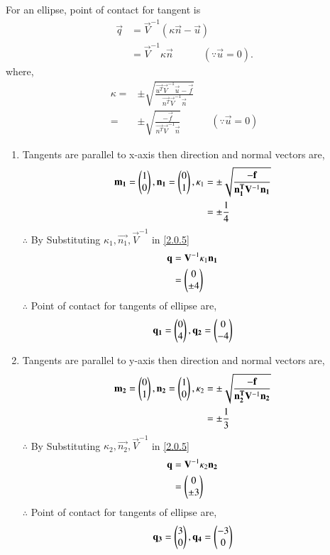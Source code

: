\documentclass[journal,12pt,twocolumn]{IEEEtran}
\begin{document}
For an ellipse, point of contact for tangent is
\begin{align}
\vec{q}&=\vec{V}^{-1}(\kappa\vec{n}-\vec{u})\\
&=\vec{V}^{-1}\kappa\vec{n}\quad\quad\quad(\because \vec{u}=0). \label{2.0.5}
\end{align}
where,
\begin{align}
\kappa=&\pm \sqrt{\frac{\vec{u^T}\vec{V}^{-1}\vec{u}-\vec{f}}{\vec{n^T}\vec{V}^{-1}\vec{n}}}\\
      =&\pm \sqrt{\frac{-\vec{f}}{\vec{n^T}\vec{V}^{-1}\vec{n}}}\label{2.0.7}\quad \quad\quad(\because \vec{u}=0)
\end{align}
\begin{enumerate}
\item Tangents are parallel to x-axis then direction and normal vectors are,
\begin{align}
\mathbf{m_1} = \begin{pmatrix}1\\0\end{pmatrix},\mathbf{n_1} = \begin{pmatrix}0\\1\end{pmatrix},
\kappa_1 &=\pm \sqrt{\frac{-\mathbf{f}}{\mathbf{n_1^T}\mathbf{V}^{-1}\mathbf{n_1}}} \\
 &=\pm\frac{1}{4}
\end{align}
$\therefore$ By Substituting $\kappa_1,\vec{n_1},\vec{V}^{-1}$ in \eqref{2.0.5}
\begin{align}
\mathbf{q}&=\mathbf{V}^{-1}\kappa_1\mathbf{n_1} \\
&=\begin{pmatrix}0\\\pm4\end{pmatrix}
\end{align}
$\therefore$ Point of contact for tangents of ellipse are,
\begin{align}
  \mathbf{q_1}=\begin{pmatrix}0\\4\end{pmatrix},\mathbf{q_2}=\begin{pmatrix}0\\-4\end{pmatrix}
\end{align}
\item Tangents are parallel to y-axis then direction and normal vectors are,
\begin{align}
\mathbf{m_2} = \begin{pmatrix}0\\1\end{pmatrix},\mathbf{n_2} = \begin{pmatrix}1\\0\end{pmatrix},
\kappa_2 &=\pm \sqrt{\frac{-\mathbf{f}}{\mathbf{n_2^T}\mathbf{V}^{-1}\mathbf{n_2}}} \\
 &=\pm\frac{1}{3}
\end{align}
$\therefore$ By Substituting $\kappa_2,\vec{n_2},\vec{V}^{-1}$ in \eqref{2.0.5}
\begin{align}
\mathbf{q}&=\mathbf{V}^{-1}\kappa_2\mathbf{n_2} \\
&=\begin{pmatrix}0\\\pm3\end{pmatrix}
\end{align}
$\therefore$ Point of contact for tangents of ellipse are,
\begin{align}
  \mathbf{q_3}=\begin{pmatrix}3\\0\end{pmatrix},\mathbf{q_4}=\begin{pmatrix}-3\\0\end{pmatrix}
\end{align}
\end{enumerate}
\end{document}
